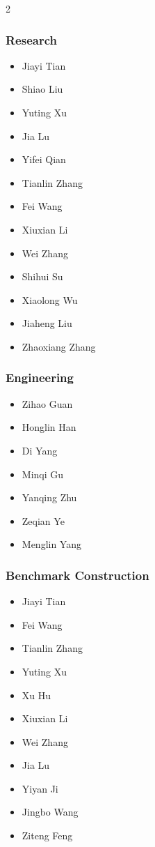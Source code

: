 \setlength{\parskip}{0pt} %
\setlength{\itemsep}{0pt} %
\setlength{\parsep}{0pt}  %
\begin{multicols}{2}
\raggedcolumns

\subsubsection*{Research}
\begin{itemize}
\item Jiayi Tian
\item Shiao Liu
\item Yuting Xu
\item Jia Lu
\item Yifei Qian
\item Tianlin Zhang
\item Fei Wang
\item Xiuxian Li
\item Wei Zhang
\item Shihui Su
\item Xiaolong Wu
\item Jiaheng Liu
\item Zhaoxiang Zhang
\end{itemize}

\subsubsection*{Engineering}
\begin{itemize}
\item Zihao Guan
\item Honglin Han
\item Di Yang
\item Minqi Gu
\item Yanqing Zhu
\item Zeqian Ye
\item Menglin Yang
\end{itemize}

\columnbreak

\subsubsection*{Benchmark Construction}
\begin{itemize}
\item Jiayi Tian
\item Fei Wang
\item Tianlin Zhang
\item Yuting Xu
\item Xu Hu
\item Xiuxian Li
\item Wei Zhang
\item Jia Lu
\item Yiyan Ji
\item Jingbo Wang
\item Ziteng Feng


\end{itemize}
\end{multicols}
